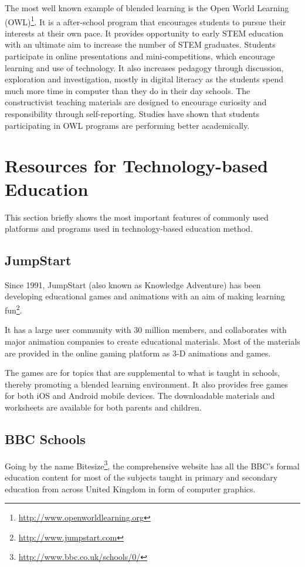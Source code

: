 The most well known example of blended learning is the Open World Learning (OWL)\footnote{\url{http://www.openworldlearning.org}}. It is a after-school program that encourages students to pursue their interests at their own pace. It provides opportunity  to early STEM education with an ultimate aim to increase the number of STEM graduates. Students participate in online presentations and mini-competitions, which encourage learning and use of technology.
It also increases pedagogy through discussion, exploration and investigation, mostly in digital literacy as the students spend much more time in computer than they do in their day schools. The constructivist teaching materials are designed to encourage curiosity  and responsibility through self-reporting. Studies have shown that students participating in OWL programs are performing better academically. 

\section{Resources for Technology-based Education}

This section briefly shows the most important features of commonly used platforms and programs used in technology-based education method. 
 

 
 
\subsection{JumpStart}
Since 1991, JumpStart (also known as Knowledge Adventure) has been developing educational games and animations with an aim of making learning fun\footnote{\url{http://www.jumpstart.com}}.

It has a large user community with 30 million members, and collaborates with major animation companies to create educational materials. Most of the materials are provided in the online gaming platform as 3-D animations and games.

The games are for topics that are supplemental to what is taught in schools, thereby promoting a blended learning environment. It also provides free games for both iOS and Android mobile devices. The downloadable materials and worksheets are available for both parents and children.

\subsection{BBC Schools}
Going by the name Bitesize\footnote{\url{http://www.bbc.co.uk/schools/0/}}, the comprehensive website  has all the BBC’s formal education content for most of the subjects taught in primary and secondary education from across United Kingdom in form of computer graphics.

